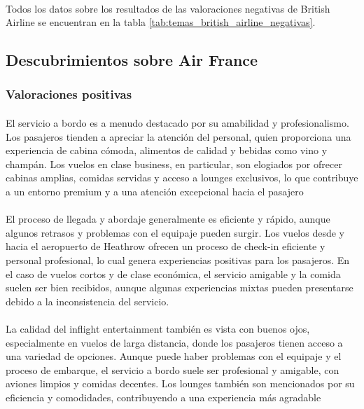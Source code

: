 \documentclass{report}
\begin{document}
{                    \paragraph*{}{
                        Todos los datos sobre los resultados de las valoraciones negativas de British Airline se encuentran en la tabla \ref{tab:temas_british_airline_negativas}.
                    }
            \clearpage\subsection{Descubrimientos sobre Air France}
                \subsubsection*{Valoraciones positivas}
                    \paragraph*{}{
                        El servicio a bordo es a menudo destacado por su amabilidad y profesionalismo. Los pasajeros tienden a apreciar la atención del personal, quien proporciona una experiencia de cabina cómoda, alimentos de calidad y bebidas como vino y champán. Los vuelos en clase business, en particular, son elogiados por ofrecer cabinas amplias, comidas servidas y acceso a lounges exclusivos, lo que contribuye a un entorno premium y a una atención excepcional hacia el pasajero
                    }
                    \paragraph*{}{
                        El proceso de llegada y abordaje generalmente es eficiente y rápido, aunque algunos retrasos y problemas con el equipaje pueden surgir. Los vuelos desde y hacia el aeropuerto de Heathrow ofrecen un proceso de check-in eficiente y personal profesional, lo cual genera experiencias positivas para los pasajeros. En el caso de vuelos cortos y de clase económica, el servicio amigable y la comida suelen ser bien recibidos, aunque algunas experiencias mixtas pueden presentarse debido a la inconsistencia del servicio.
                    }
                    \paragraph*{}{
                        La calidad del inflight entertainment también es vista con buenos ojos, especialmente en vuelos de larga distancia, donde los pasajeros tienen acceso a una variedad de opciones. Aunque puede haber problemas con el equipaje y el proceso de embarque, el servicio a bordo suele ser profesional y amigable, con aviones limpios y comidas decentes. Los lounges también son mencionados por su eficiencia y comodidades, contribuyendo a una experiencia más agradable
                    }
}
\end{document}
